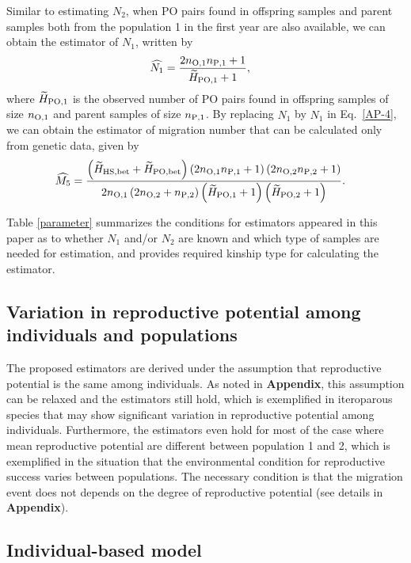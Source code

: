 \documentclass[12pt, English]{article}
\begin{document}
\begin{spacing}{1.9}
Similar to estimating $N_2$, when PO pairs found in offspring samples and parent samples both from the population 1 in the first year are also available, we can obtain the estimator of $N_1$, written by
\begin{align}
\widehat{N_1} &= \frac{ 2 n_{\rm O, 1} n_{\rm P, 1} + 1 }{\widetilde{H}_{\rm PO, 1} + 1},
\label{AP-6}
\end{align}
where $\widetilde{H}_{\rm PO, 1}$ is the observed number of PO pairs found in offspring samples of size $n_{\rm O, 1}$ and parent samples of size $n_{\rm P, 1}$. By replacing $N_1$ by $\widehat{N_1}$ in Eq.~\ref{AP-4}, we can obtain the estimator of migration number that can be calculated only from genetic data, given by
\begin{align}
\widehat{M_5} &=  \frac{ \left(\widetilde{H}_{\rm HS,bet} + \widetilde{H}_{\rm PO,bet}\right) \left(2 n_{\rm O, 1} n_{\rm P, 1} + 1\right) \left(2 n_{\rm O, 2} n_{\rm P, 2} + 1\right)} {2n_{\rm O, 1} \left(2 n_{\rm O, 2} + n_{\rm P, 2}\right) \left(\widetilde{H}_{\rm PO, 1} + 1\right) \left(\widetilde{H}_{\rm PO, 2} + 1\right)}.
\label{AP-7}
\end{align}

Table \ref{parameter} summarizes the conditions for estimators appeared in this paper as to whether $N_1$ and/or $N_2$ are known and which type of samples are needed for estimation, and provides required kinship type for calculating the estimator. 

\subsection{Variation in reproductive potential among individuals and populations}

The proposed estimators are derived under the assumption that reproductive potential is the same among individuals. As noted in {\bf Appendix}, this assumption can be relaxed and the estimators still hold, which is exemplified in iteroparous species that may show significant variation in reproductive potential among individuals. Furthermore, the estimators even hold for most of the case where mean reproductive potential are different between population 1 and 2, which is exemplified in the situation that the environmental condition for reproductive success varies between populations. The necessary condition is that the migration event does not depends on the degree of reproductive potential (see details in  {\bf Appendix}). 

\subsection{Individual-based model}


\end{spacing}
\end{document}
